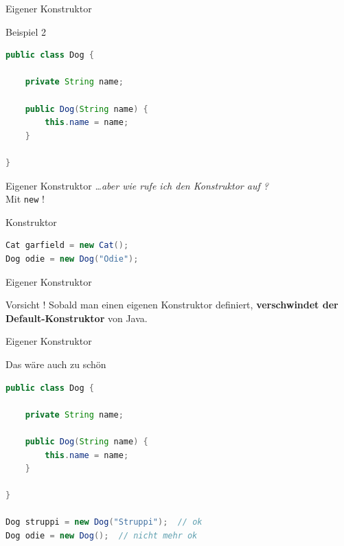 \documentclass[18pt]{beamer}
\begin{document}
\begin{frame}[fragile]{Eigener Konstruktor}
    \begin{exampleblock}{Beispiel 2}
        \begin{lstlisting}[language=Java]
public class Dog {

    private String name;

    public Dog(String name) {
        this.name = name;
    }

}
        \end{lstlisting}

    \end{exampleblock}

\end{frame}


\begin{frame}[fragile]{Eigener Konstruktor}
    \textit{\dots aber wie rufe ich den Konstruktor auf ?}
    \pause
    \\
    \vspace{.2in}
    {\huge Mit \texttt{new} !}
    \vspace{.2in}
    \begin{exampleblock}{Konstruktor}
        \begin{lstlisting}[language=Java]
Cat garfield = new Cat();
Dog odie = new Dog("Odie");
        \end{lstlisting}

    \end{exampleblock}
\end{frame}


\begin{frame}{Eigener Konstruktor}
    \begin{alertblock}{Vorsicht !}
        Sobald man einen eigenen Konstruktor definiert, \textbf{verschwindet der Default-Konstruktor} von Java.
    \end{alertblock}
\end{frame}

\begin{frame}[fragile]{Eigener Konstruktor}
    \begin{exampleblock}{Das wäre auch zu schön}
        \begin{lstlisting}[language=Java]
public class Dog {

    private String name;

    public Dog(String name) {
        this.name = name;
    }

}

Dog struppi = new Dog("Struppi");  // ok
Dog odie = new Dog();  // nicht mehr ok
        \end{lstlisting}

    \end{exampleblock}


\end{frame}
\end{document}
